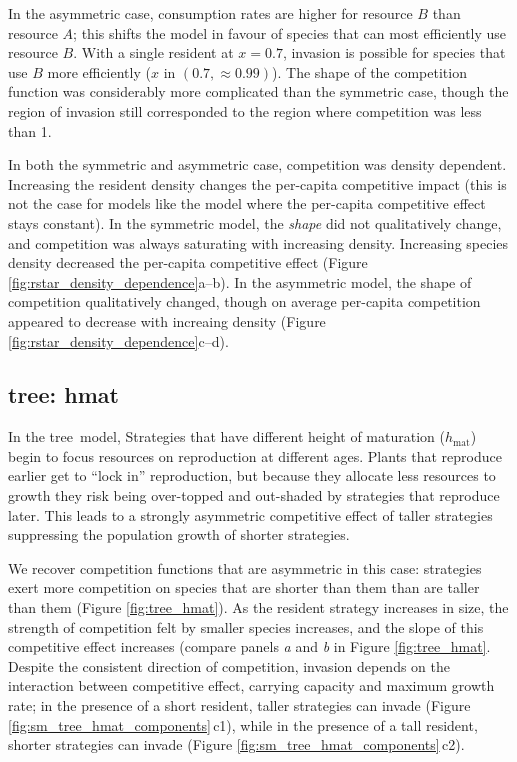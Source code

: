 \documentclass[a4paper,11pt]{article}
\newcommand{\TREE}{{\sc tree}}
\newcommand{\hmat}{\ensuremath{h_{\text{mat}}}}
\begin{document}
In the asymmetric case, consumption rates are higher for
resource $B$ than resource $A$; this shifts the model in favour of
species that can most efficiently use resource $B$.
%
With a single resident at $x = 0.7$, invasion is possible for species
that use $B$ more efficiently ($x$ in $(0.7, \approx 0.99)$).
%
The shape of the competition function was considerably more
complicated than the symmetric case, though the region of invasion
still corresponded to the region where competition was less than 1.

In both the symmetric and asymmetric case, competition was density
dependent.  Increasing the resident density changes the per-capita
competitive impact (this is not the case for models like the
\citet{Dieckmann-1999} model where the per-capita competitive effect
stays constant).
%
In the symmetric model, the \emph{shape} did not qualitatively change,
and competition was always saturating with increasing density.
Increasing species density decreased the per-capita competitive effect
(Figure \ref{fig:rstar_density_dependence}a--b).
%
In the asymmetric model, the shape of competition qualitatively
changed, though on average per-capita competition appeared to decrease
with increaing density (Figure
\ref{fig:rstar_density_dependence}c--d).

\subsection{\TREE: hmat}

In the \TREE\ model, Strategies that have different height of
maturation (\hmat) begin to focus resources on reproduction at
different ages.  Plants that reproduce earlier get to ``lock in''
reproduction, but because they allocate less resources to growth they
risk being over-topped and out-shaded by strategies that reproduce
later.  This leads to a strongly asymmetric competitive effect of
taller strategies suppressing the population growth of shorter
strategies.

We recover competition functions that are asymmetric in this case:
strategies exert more competition on species that are shorter than
them than are taller than them (Figure \ref{fig:tree_hmat}).  As the
resident strategy increases in size, the strength of competition felt
by smaller species increases, and the slope of this competitive effect
increases (compare panels \textit{a} and \textit{b} in Figure
\ref{fig:tree_hmat}.
%
Despite the consistent direction of competition, invasion depends on
the interaction between competitive effect, carrying capacity and
maximum growth rate; in the presence of a short resident, taller
strategies can invade (Figure \ref{fig:sm_tree_hmat_components}\,c1),
while in the presence of a tall resident, shorter strategies can
invade (Figure \ref{fig:sm_tree_hmat_components}\,c2).
\end{document}
